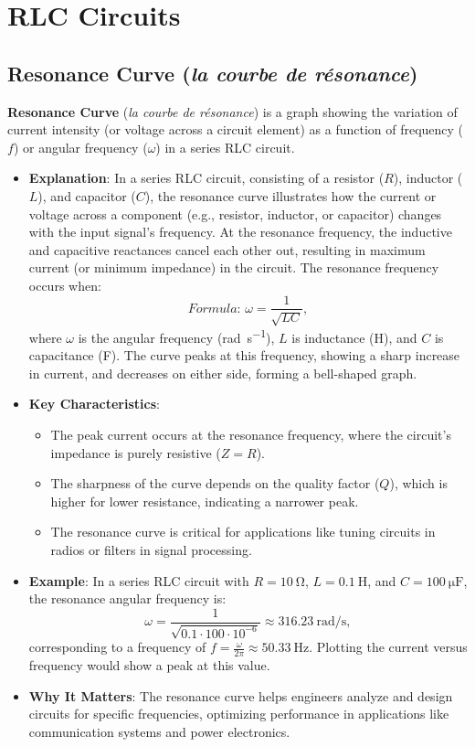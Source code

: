 \documentclass[12pt]{article}
\newcommand{\concept}[1]{\textbf{#1}}
\newcommand{\formula}[1]{\textit{Formula: }#1}
\begin{document}
\section{RLC Circuits}
\subsection{Resonance Curve (\textit{la courbe de résonance})}
\concept{Resonance Curve} (\textit{la courbe de résonance}) is a graph showing the variation of current intensity (or voltage across a circuit element) as a function of frequency (\(f\)) or angular frequency (\(\omega\)) in a series RLC circuit.
\begin{itemize}
    \item \textbf{Explanation}: In a series RLC circuit, consisting of a resistor (\(R\)), inductor (\(L\)), and capacitor (\(C\)), the resonance curve illustrates how the current or voltage across a component (e.g., resistor, inductor, or capacitor) changes with the input signal’s frequency. At the resonance frequency, the inductive and capacitive reactances cancel each other out, resulting in maximum current (or minimum impedance) in the circuit. The resonance frequency occurs when:
        \[
        \formula{\omega = \frac{1}{\sqrt{L C}}},
        \]
        where \(\omega\) is the angular frequency (\si{\radian\per\second}), \(L\) is inductance (\si{\henry}), and \(C\) is capacitance (\si{\farad}). The curve peaks at this frequency, showing a sharp increase in current, and decreases on either side, forming a bell-shaped graph.
    \item \textbf{Key Characteristics}:
        \begin{itemize}
            \item The peak current occurs at the resonance frequency, where the circuit’s impedance is purely resistive (\(Z = R\)).
            \item The sharpness of the curve depends on the quality factor (\(Q\)), which is higher for lower resistance, indicating a narrower peak.
            \item The resonance curve is critical for applications like tuning circuits in radios or filters in signal processing.
        \end{itemize}
    \item \textbf{Example}: In a series RLC circuit with \(R = \SI{10}{\ohm}\), \(L = \SI{0.1}{\henry}\), and \(C = \SI{100}{\micro\farad}\), the resonance angular frequency is:
        \[
        \omega = \frac{1}{\sqrt{0.1 \cdot 100 \cdot 10^{-6}}} \approx \SI{316.23}{\radian\per\second},
        \]
        corresponding to a frequency of \(f = \frac{\omega}{2 \pi} \approx \SI{50.33}{\hertz}\). Plotting the current versus frequency would show a peak at this value.
    \item \textbf{Why It Matters}: The resonance curve helps engineers analyze and design circuits for specific frequencies, optimizing performance in applications like communication systems and power electronics.
\end{itemize}
\end{document}
